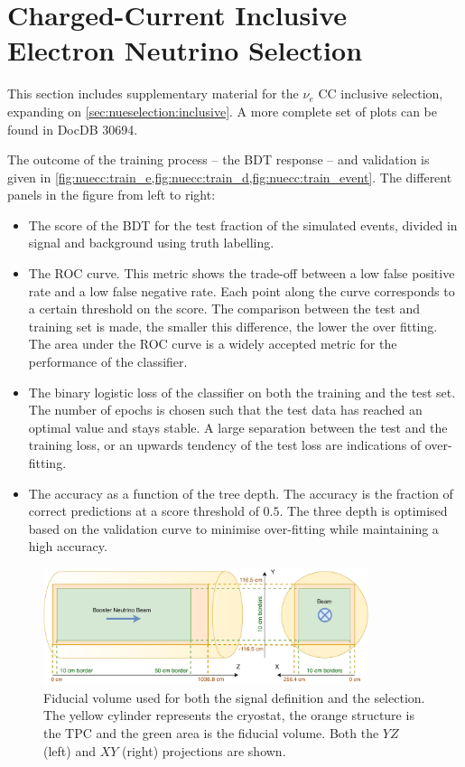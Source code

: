 \section{Charged-Current Inclusive Electron Neutrino Selection}
\label{sec:datamc:nueccinclusive}
This section includes supplementary material for the $\nu_e$ CC inclusive selection, expanding on \cref{sec:nueselection:inclusive}. A more complete set of plots can be found in DocDB 30694.

The outcome of the training process -- the BDT response -- and validation is given in \cref{fig:nuecc:train_e,fig:nuecc:train_d,fig:nuecc:train_event}. The different panels in the figure from left to right:
\begin{itemize}
\item The score of the BDT for the test fraction of the simulated events, divided in signal and background using truth labelling. 
\item The ROC curve. This metric shows the trade-off between a low false positive rate and a low false negative rate. Each point along the curve corresponds to a certain threshold on the score. The comparison between the test and training set is made, the smaller this difference, the lower the over fitting. The area under the ROC curve is a widely accepted metric for the performance of the classifier. 
\item The binary logistic loss of the classifier on both the training and the test set. The number of epochs is chosen such that the test data has reached an optimal value and stays stable. A large separation between the test and the training loss, or an upwards tendency of the test loss are indications of over-fitting.
\item The accuracy as a function of the tree depth. The accuracy is the fraction of correct predictions at a score threshold of $0.5$. The three depth is optimised based on the validation curve to minimise over-fitting while maintaining a high accuracy. 
\end{itemize} 

\begin{figure}[htb]
\centering
\includegraphics[width = 0.85\textwidth]{NueCCsel/Images/FidVolume.pdf}
\caption{Fiducial volume used for both the \nuecc signal definition and the \nuecc selection. The yellow cylinder represents the cryostat, the orange structure is the TPC and the green area is the fiducial volume. Both the $YZ$ (left) and $XY$ (right) projections are shown.}
\label{fig:nuecc:fidvol}
\end{figure}

